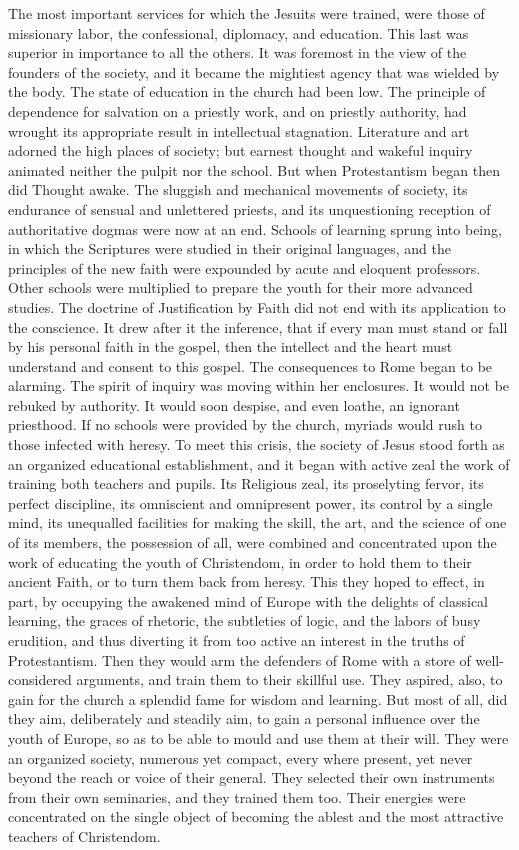 \documentclass[]{book}
\begin{document}
The most important services for which the Jesuits were trained, were those of missionary labor, the confessional, diplomacy, and education. This last was superior in importance to all the others. It was foremost in the view of the founders of the society, and it became the mightiest agency that was wielded by the body. The state of education in the church had been low. The principle of dependence for salvation on a priestly work, and on priestly authority, had wrought its appropriate result in intellectual stagnation. Literature and art adorned the high places of society; but earnest thought and wakeful inquiry animated neither the pulpit nor the school. But when Protestantism began then did Thought awake. The sluggish and mechanical movements of society, its endurance of sensual and unlettered priests, and its unquestioning reception of authoritative dogmas were now at an end. Schools of learning sprung into being, in which the Scriptures were studied in their original languages, and the principles of the new faith were expounded by acute and eloquent professors. Other schools were multiplied to prepare the youth for their more advanced studies. The doctrine of Justification by Faith did not end with its application to the conscience. It drew after it the inference, that if every man must stand or fall by his personal faith in the gospel, then the intellect and the heart must understand and consent to this gospel. The consequences to Rome began to be alarming. The spirit of inquiry was moving within her enclosures. It would not be rebuked by authority. It would soon despise, and even loathe, an ignorant priesthood. If no schools were provided by the church, myriads would rush to those infected with heresy. To meet this crisis, the society of Jesus stood forth as an organized educational establishment, and it began with active zeal the work of training both teachers and pupils. Its Religious zeal, its proselyting fervor, its perfect discipline, its omniscient and omnipresent power, its control by a single mind, its unequalled facilities for making the skill, the art, and the science of one of its members, the possession of all, were combined and concentrated upon the work of educating the youth of Christendom, in order to hold them to their ancient Faith, or to turn them back from heresy. This they hoped to effect, in part, by occupying the awakened mind of Europe with the delights of classical learning, the graces of rhetoric, the subtleties of logic, and the labors of busy erudition, and thus diverting it from too active an interest in the truths of Protestantism. Then they would arm the defenders of Rome with a store of well-considered arguments, and train them to their skillful use. They aspired, also, to gain for the church a splendid fame for wisdom and learning. But most of all, did they aim, deliberately and steadily aim, to gain a personal influence over the youth of Europe, so as to be able to mould and use them at their will. They were an organized society, numerous yet compact, every where present, yet never beyond the reach or voice of their general. They selected their own instruments from their own seminaries, and they trained them too. Their energies were concentrated on the single object of becoming the ablest and the most attractive teachers of Christendom. 
\end{document}
